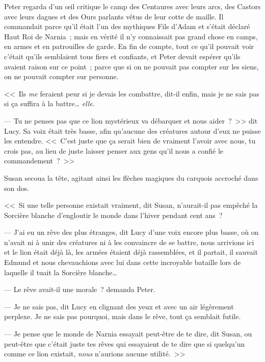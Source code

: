 Peter regarda d'un œil critique le camp des Centaures avec leurs arcs, des Castors avec leurs dagues et des Ours parlants vêtus de leur cotte de maille. Il commandait parce qu'il était l'un des mythiques Fils d'Adam et s'était déclaré Haut Roi de Narnia~; mais en vérité il n'y connaissait pas grand chose en camps, en armes et en patrouilles de garde. En fin de compte, tout ce qu'il pouvait voir c'était qu'ils semblaient tous fiers et confiants, et Peter devait espérer qu'ils avaient raison sur ce point~; parce que si on ne pouvait pas compter sur les siens, on ne pouvait compter sur personne.

<<~Ils \emph{me} feraient peur si je devais les combattre, dit-il enfin, mais je ne sais pas si ça suffira à la battre… \emph{elle.}

--- Tu ne penses pas que ce lion mystérieux va débarquer et nous aider~?~>> dit Lucy. Sa voix était très basse, afin qu'aucune des créatures autour d'eux ne puisse les entendre. <<~C'est juste que ça serait bien de vraiment l'avoir avec nous, tu crois pas, au lieu de juste laisser penser aux gens qu'il nous a confié le commandement~?~>>

Susan secoua la tête, agitant ainsi les flèches magiques du carquois accroché dans son dos.

<<~Si une telle personne existait vraiment, dit Susan, n'aurait-il pas empêché la Sorcière blanche d'engloutir le monde dans l'hiver pendant cent ans~?

--- J'ai eu un rêve des plus étranges, dit Lucy d'une voix encore plus basse, où on n'avait ni à unir des créatures ni à les convaincre de se battre, nous arrivions ici et le lion était déjà là, les armées étaient déjà rassemblées, et il partait, il sauvait Edmund et nous chevauchions avec lui dans cette incroyable bataille lors de laquelle il tuait la Sorcière blanche…

--- Le rêve avait-il une morale~? demanda Peter.

--- Je ne sais pas, dit Lucy en clignant des yeux et avec un air légèrement perplexe. Je ne sais pas pourquoi, mais dans le rêve, tout ça semblait futile.

--- Je pense que le monde de Narnia essayait peut-être de te dire, dit Susan, ou peut-être que c'était juste tes rêves qui essayaient de te dire que si quelqu'un comme ce lion existait, \emph{nous} n'aurions aucune utilité.~>>


